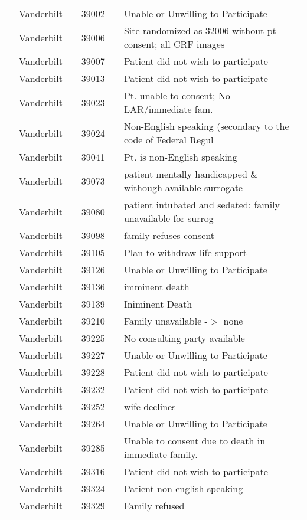 \documentclass[dvips, 10pt]{article}
\begin{document}
\begin{table}[t]
\begin{center}
\begin{tabular}{ @{}l@{}
@{}l@{}@{}p{1.5em}@{}@{}c@{}@{}p{1.5em}@{}@{}l@{}
}
\\
& Vanderbilt && 39002 && Unable or Unwilling to Participate \\
& Vanderbilt && 39006 && Site randomized as 32006 without pt consent; all CRF images \\
& Vanderbilt && 39007 && Patient did not wish to participate \\
& Vanderbilt && 39013 && Patient did not wish to participate \\
& Vanderbilt && 39023 && Pt. unable to consent; No LAR/immediate fam. \\
& Vanderbilt && 39024 && Non-English speaking (secondary to the code of Federal Regul \\
& Vanderbilt && 39041 && Pt. is non-English speaking \\
& Vanderbilt && 39073 && patient mentally handicapped \& withough available surrogate \\
& Vanderbilt && 39080 && patient intubated and sedated; family unavailable for surrog \\
& Vanderbilt && 39098 && family refuses consent \\
& Vanderbilt && 39105 && Plan to withdraw life support \\
& Vanderbilt && 39126 && Unable or Unwilling to Participate \\
& Vanderbilt && 39136 && imminent death \\
& Vanderbilt && 39139 && Iniminent Death \\
& Vanderbilt && 39210 && Family unavailable -$>$ none \\
& Vanderbilt && 39225 && No consulting party available \\
& Vanderbilt && 39227 && Unable or Unwilling to Participate \\
& Vanderbilt && 39228 && Patient did not wish to participate \\
& Vanderbilt && 39232 && Patient did not wish to participate \\
& Vanderbilt && 39252 && wife declines \\
& Vanderbilt && 39264 && Unable or Unwilling to Participate \\
& Vanderbilt && 39285 && Unable to consent due to death in immediate family. \\
& Vanderbilt && 39316 && Patient did not wish to participate \\
& Vanderbilt && 39324 && Patient non-english speaking \\
& Vanderbilt && 39329 && Family refused \\

\end{tabular}
\end{center}
\end{table}
\end{document}
